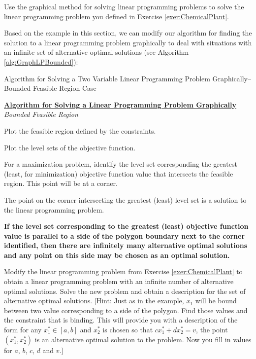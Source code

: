 





\begin{exercise}{}{} Use the graphical method for solving linear programming problems to solve the linear programming problem you defined in Exercise \ref{exer:ChemicalPlant}.
\end{exercise}



Based on the example in this section, we can modify our algorithm for finding the solution to a linear programming problem graphically to deal with situations with an infinite set of alternative optimal solutions (see Algorithm \ref{alg:GraphLPBounded}):
\begin{algorithm}[H]
\caption{Algorithm for Solving a Two Variable Linear Programming Problem Graphically--Bounded Feasible Region Case}
\label{alg:GraphLPBounded}
\begin{center}
\begin{minipage}[t]{\textwidth-1em}
\underline{\textbf{Algorithm for Solving a Linear Programming Problem Graphically}}\\
\textit{Bounded Feasible Region}
\begin{enumerate*}
\item Plot the feasible region defined by the constraints.
\item Plot the level sets of the objective function.
\item For a maximization problem, identify the level set corresponding the greatest (least, for minimization) objective function value that intersects the feasible region. This point will be at a corner. 
\item The point on the corner intersecting the greatest (least) level set is a solution to the linear programming problem. 
\item \textbf{If the level set corresponding to the greatest (least) objective function value is parallel to a side of the polygon boundary next to the corner identified, then there are infinitely many alternative optimal solutions and any point on this side may be chosen as an optimal solution.} 
\end{enumerate*}
\end{minipage}
\end{center}
\end{algorithm}

\begin{exercise}{}{} Modify the linear programming problem from Exercise \ref{exer:ChemicalPlant} to obtain a linear programming problem with an infinite number of alternative optimal solutions. Solve the new problem and obtain a description for the set of alternative optimal solutions. [Hint: Just as in the example, $x_1$ will be bound between two value corresponding to a side of the polygon. Find those values and the constraint that is binding. This will provide you with a description of the form for any $x_1^* \in [a,b]$ and $x_2^*$ is chosen so that $cx_1^* + dx_2^* = v$, the point $(x_1^*, x_2^*)$ is an alternative optimal solution to the problem. Now you fill in values for $a$, $b$, $c$, $d$ and $v$.]
\end{exercise}

